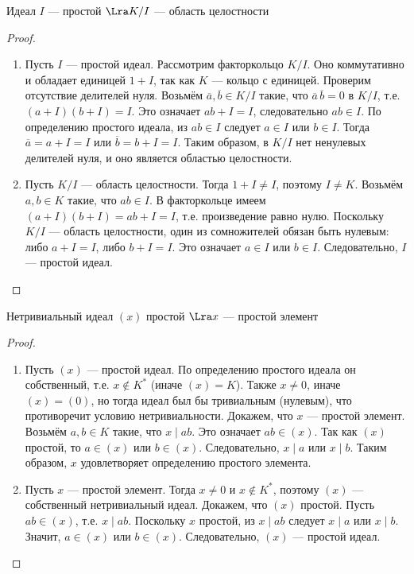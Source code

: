 \begin{proposition}
    Идеал \(I\) --- простой \(\Lra K/I\) --- область целостности
\end{proposition}
\begin{proof}\indent
    \begin{enumerate}
        \item[\(\Ra\)] Пусть \(I\) --- простой идеал. Рассмотрим факторкольцо \(K/I\). Оно коммутативно и обладает единицей \(1+I\), так как \(K\) --- кольцо с единицей. Проверим отсутствие делителей нуля. Возьмём \(\overline{a}, \overline{b} \in K/I\) такие, что \(\overline{a}\,\overline{b} = 0\) в \(K/I\), т.е. \((a+I)(b+I) = I\). Это означает \(ab + I = I\), следовательно \(ab \in I\). По определению простого идеала, из \(ab \in I\) следует \(a \in I\) или \(b \in I\). Тогда \(\overline{a} = a+I = I\) или \(\overline{b} = b+I = I\). Таким образом, в \(K/I\) нет ненулевых делителей нуля, и оно является областью целостности.

        \item[\(\La\)] Пусть \(K/I\) --- область целостности. Тогда \(1+I \neq I\), поэтому \(I \neq K\). Возьмём \(a, b \in K\) такие, что \(ab \in I\). В факторкольце имеем \((a+I)(b+I) = ab + I = I\), т.е. произведение равно нулю. Поскольку \(K/I\) --- область целостности, один из сомножителей обязан быть нулевым: либо \(a+I = I\), либо \(b+I = I\). Это означает \(a \in I\) или \(b \in I\). Следовательно, \(I\) --- простой идеал.
    \end{enumerate}
\end{proof}

\begin{proposition}
    Нетривиальный идеал \((x)\) простой \(\Lra x\) --- простой элемент
\end{proposition}
\begin{proof}\indent
    \begin{enumerate}
        \item[\(\Ra\)] Пусть \((x)\) --- простой идеал. По определению простого идеала он собственный, т.е. \(x \notin K^*\) (иначе \((x) = K\)). Также \(x \neq 0\), иначе \((x) = (0)\), но тогда идеал был бы тривиальным (нулевым), что противоречит условию нетривиальности. Докажем, что \(x\) --- простой элемент. Возьмём \(a, b \in K\) такие, что \(x \mid ab\). Это означает \(ab \in (x)\). Так как \((x)\) простой, то \(a \in (x)\) или \(b \in (x)\). Следовательно, \(x \mid a\) или \(x \mid b\). Таким образом, \(x\) удовлетворяет определению простого элемента.

        \item[\(\La\)] Пусть \(x\) --- простой элемент. Тогда \(x \neq 0\) и \(x \notin K^*\), поэтому \((x)\) --- собственный нетривиальный идеал. Докажем, что \((x)\) простой. Пусть \(ab \in (x)\), т.е. \(x \mid ab\). Поскольку \(x\) простой, из \(x \mid ab\) следует \(x \mid a\) или \(x \mid b\). Значит, \(a \in (x)\) или \(b \in (x)\). Следовательно, \((x)\) --- простой идеал.
    \end{enumerate}
\end{proof}

